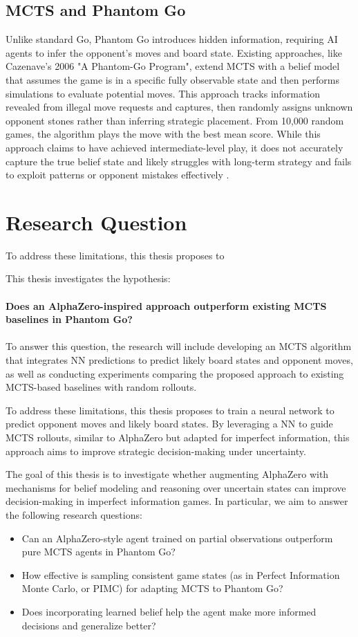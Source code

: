 \documentclass[12pt,oneside,openright]{article}
\begin{document}
\subsection{MCTS and Phantom Go}

Unlike standard Go, Phantom Go introduces hidden information,
requiring AI agents to infer the opponent’s moves and board state.
Existing approaches, like Cazenave's 2006 "A Phantom-Go Program",
extend MCTS with a belief model that assumes
the game is in a specific fully observable state and then performs
simulations to evaluate potential moves. This approach tracks
information revealed from illegal move requests and captures, then
randomly assigns unknown opponent stones rather than inferring strategic placement.
From 10,000 random games, the algorithm plays the move with the best mean score.
While this approach claims to have achieved intermediate-level play,
it does not accurately capture the true belief state and likely struggles
with long-term strategy and fails to exploit patterns or opponent mistakes
effectively \cite{Cazenave2006phantomGo}.


\section{Research Question}

To address these limitations, this thesis proposes to

This thesis investigates the hypothesis:
\\
\\
\textbf{Does an AlphaZero-inspired approach outperform existing MCTS baselines in Phantom Go?}
\\
\\
To answer this question, the research will include developing an MCTS algorithm that integrates NN predictions to predict likely board states and opponent moves, as well as conducting experiments comparing the proposed approach to existing MCTS-based baselines with random rollouts.

To address these limitations, this thesis proposes to train a neural network to predict opponent moves and likely board states. By leveraging a NN to guide MCTS rollouts, similar to AlphaZero but adapted for imperfect information, this approach aims to improve strategic decision-making under uncertainty.

The goal of this thesis is to investigate whether augmenting AlphaZero with mechanisms for belief modeling and reasoning over uncertain states can improve decision-making in imperfect information games. In particular, we aim to answer the following research questions:
\begin{itemize}
    \item Can an AlphaZero-style agent trained on partial observations outperform pure MCTS agents in Phantom Go?
    \item How effective is sampling consistent game states (as in Perfect Information Monte Carlo, or PIMC) for adapting MCTS to Phantom Go?
    \item Does incorporating learned belief help the agent make more informed decisions and generalize better?
\end{itemize}
\end{document}
